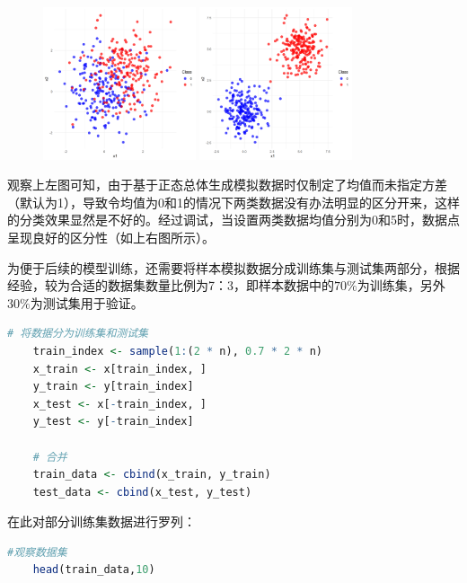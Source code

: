 \documentclass[12pt]{article}  %
\begin{document}
\begin{figure}[H]
	\centering
	\includegraphics[width=0.4\textwidth]{2.png}
	\includegraphics[width=0.4\textwidth]{3.png}
\end{figure}

观察上左图可知，由于基于正态总体生成模拟数据时仅制定了均值而未指定方差（默认为1），导致令均值为0和1的情况下两类数据没有办法明显的区分开来，这样的分类效果显然是不好的。经过调试，当设置两类数据均值分别为0和5时，数据点呈现良好的区分性（如上右图所示）。

为便于后续的模型训练，还需要将样本模拟数据分成训练集与测试集两部分，根据经验，较为合适的数据集数量比例为7：3，即样本数据中的$70\%$为训练集，另外$30\%$为测试集用于验证。

\begin{lstlisting}[language=R]
	# 将数据分为训练集和测试集
	train_index <- sample(1:(2 * n), 0.7 * 2 * n)
	x_train <- x[train_index, ]
	y_train <- y[train_index]
	x_test <- x[-train_index, ]
	y_test <- y[-train_index]
	
	# 合并 
	train_data <- cbind(x_train, y_train)
	test_data <- cbind(x_test, y_test)
\end{lstlisting}

在此对部分训练集数据进行罗列：

\begin{lstlisting}[language=R]
	#观察数据集
	head(train_data,10)
\end{lstlisting}
\end{document}
